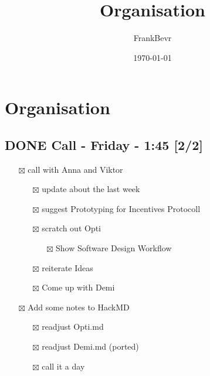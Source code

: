 \documentclass[11pt]{article}
\author{FrankBevr}
\date{\today}
\title{Organisation}
\begin{document}
\maketitle
\tableofcontents

\section{Organisation}
\label{sec:orgf726797}
\subsection{{\bfseries\sffamily DONE} Call - Friday - 1:45 [2/2]}
\label{sec:org3c89bf6}
\begin{itemize}
\item[{$\boxtimes$}] call with Anna and Viktor
\begin{itemize}
\item[{$\boxtimes$}] update about the last week
\item[{$\boxtimes$}] suggest Prototyping for Incentives Protocoll
\item[{$\boxtimes$}] scratch out Opti
\begin{itemize}
\item[{$\boxtimes$}] Show Software Design Workflow
\end{itemize}
\item[{$\boxtimes$}] reiterate Ideas
\item[{$\boxtimes$}] Come up with Demi
\end{itemize}
\item[{$\boxtimes$}] Add some notes to HackMD
\begin{itemize}
\item[{$\boxtimes$}] readjust Opti.md
\item[{$\boxtimes$}] readjust Demi.md (ported)
\item[{$\boxtimes$}] call it a day
\end{itemize}
\end{itemize}
\end{document}
